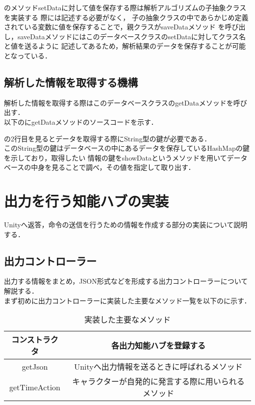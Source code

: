 のメソッドsetDataに対して値を保存する際は解析アルゴリズムの子抽象クラスを実装する
際には記述する必要がなく，
子の抽象クラスの中であらかじめ定義されている変数に値を保存することで，親クラスがsaveDataメソッド
を呼び出し，saveDataメソッドにはこのデータベースクラスのsetDataに対してクラス名と値を送るように
記述してあるため，解析結果のデータを保存することが可能となっている．
\\
\subsection{解析した情報を取得する機構}
解析した情報を取得する際はこのデータベースクラスのgetDataメソッドを呼び出す．
\\
以下のにgetDataメソッドのソースコードを示す．

の2行目を見るとデータを取得する際にString型の鍵が必要である．
\\
このString型の鍵はデータベースの中にあるデータを保存しているHashMapの鍵を示しており，取得したい
情報の鍵をshowDataというメソッドを用いてデータベースの中身を見ることで調べ，その値を指定して取り出す．


\section{出力を行う知能ハブの実装}
Unityへ返答，命令の送信を行うための情報を作成する部分の実装について説明する．
\\
\subsection{出力コントローラー}
出力する情報をまとめ，JSON形式などを形成する出力コントローラーについて解説する．\\
まず初めに出力コントローラーに実装した主要なメソッド一覧を以下のに示す．\\

\begin{table}[tbh]
	\caption{実装した主要なメソッド} \label{tab:OutputController}
	\begin{center}
		\begin{tabular}[htb]{c|c}
		\hline
		コンストラクタ & 各出力知能ハブを登録する \\
		\hline
		getJson & Unityへ出力情報を送るときに呼ばれるメソッド \\
		\hline
		getTimeAction & キャラクターが自発的に発言する際に用いられるメソッド \\
		\hline
		\end{tabular}
	\end{center}
\end{table}


